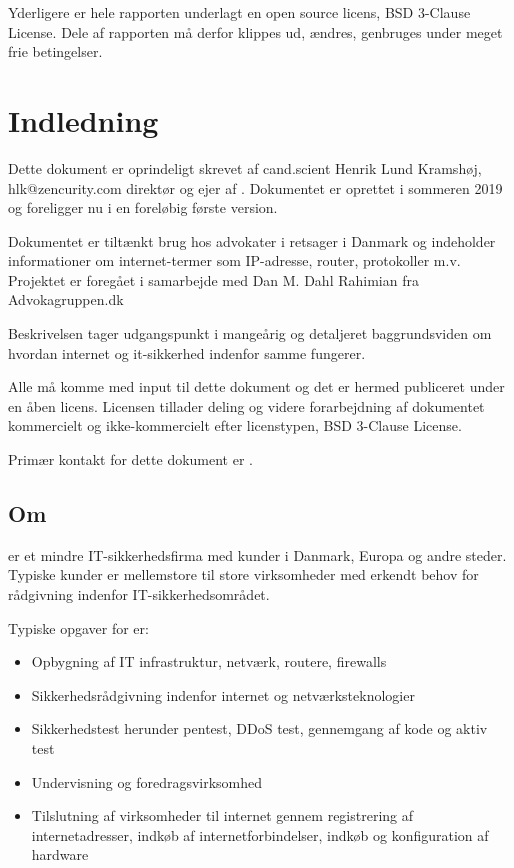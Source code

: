 \documentclass[a4paper,11pt,notitlepage]{report}
\begin{document}
Yderligere er hele rapporten underlagt en open source licens, BSD 3-Clause License. Dele af rapporten må derfor klippes ud, ændres, genbruges under meget frie betingelser.

\chapter{\color{titlecolor}Indledning}


Dette dokument er oprindeligt skrevet af cand.scient Henrik Lund Kramshøj, hlk@zencurity.com direktør og ejer af \company. Dokumentet er oprettet i sommeren 2019 og foreligger nu i en foreløbig første version.

Dokumentet er tiltænkt brug hos advokater i retsager i Danmark og indeholder informationer om internet-termer som IP-adresse, router, protokoller m.v. Projektet er foregået i samarbejde med Dan M. Dahl Rahimian fra Advokagruppen.dk

Beskrivelsen tager udgangspunkt i mangeårig og detaljeret baggrundsviden om hvordan internet og it-sikkerhed indenfor samme fungerer.

Alle må komme med input til dette dokument og det er hermed publiceret under en åben licens. Licensen tillader deling og videre forarbejdning af dokumentet kommercielt og ikke-kommercielt efter licenstypen, BSD 3-Clause License.

Primær kontakt for dette dokument er \consultant.

\section*{Om \company}

\company er et mindre IT-sikkerhedsfirma med kunder i Danmark, Europa og andre steder. Typiske kunder er mellemstore til store virksomheder med erkendt behov for rådgivning indenfor IT-sikkerhedsområdet.

Typiske opgaver for \company er:
\begin{itemize}
\item Opbygning af IT infrastruktur, netværk, routere, firewalls
\item Sikkerhedsrådgivning indenfor internet og netværksteknologier
\item Sikkerhedstest herunder pentest, DDoS test, gennemgang af kode og aktiv test
\item Undervisning og foredragsvirksomhed
\item Tilslutning af virksomheder til internet gennem registrering af internetadresser, indkøb af internetforbindelser, indkøb og konfiguration af hardware
\end{itemize}
\end{document}
